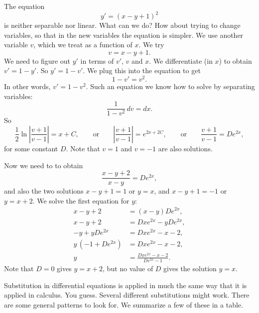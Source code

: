 The equation
\begin{equation*}
y' = {(x-y+1)}^2 
\end{equation*}
is neither separable nor linear.  What can we do?
How about trying to change variables, so that in the new variables the
equation is simpler.  We use another variable $v$, which we treat as
a function of $x$.  We try
\begin{equation*}
v = x-y+1 .
\end{equation*}
We need to figure out
$y'$ in terms of $v'$, $v$ and $x$.  We differentiate (in $x$) to
obtain $v' = 1 - y'$.  So $y' = 1-v'$.  We plug this into the equation to get
\begin{equation*}
1-v' = v^2 .
\end{equation*}
In other words, $v' = 1-v^2$.  Such an equation we know how to solve by
separating variables:
\begin{equation*}
\frac{1}{1-v^2} \,dv = dx .
\end{equation*}
So
\begin{equation*}
\frac{1}{2} \ln \left\lvert  \frac{v+1}{v-1} \right\rvert = x + C ,
\qquad \text{or} \qquad
\left\lvert \frac{v+1}{v-1} \right\rvert = e^{2x + 2C} ,
\qquad \text{or} \qquad
\frac{v+1}{v-1} = D e^{2x} ,
\end{equation*}
for some constant $D$.
Note that $v=1$ and $v=-1$ are also solutions.

Now we need to  to obtain
\begin{equation*}
\frac{x-y+2}{x-y} = D e^{2x} ,
\end{equation*}
and also the two solutions $x-y+1=1$ or $y=x$, and $x-y+1=-1$ or $y=x+2$.
We solve the first equation for $y$:
\begin{equation*}
\begin{aligned}
x-y+2 &= (x-y)D e^{2x} , \\
x-y+2 &= Dx e^{2x}-yD e^{2x} , \\
-y + yD e^{2x} &= Dx e^{2x} - x - 2 , \\
y\,(-1+ D e^{2x}) &= Dx e^{2x} - x - 2 , \\
y  &= \frac{Dx e^{2x} - x - 2}{D e^{2x}-1} .
\end{aligned}
\end{equation*}
Note that $D=0$ gives $y=x+2$, but no value of $D$ gives the solution $y=x$.

\medskip

Substitution in differential equations is applied in much the same way that
it is applied in calculus.  You guess.  Several different substitutions might
work.  There are some general patterns to look for.  We summarize a few
of these in a table.

